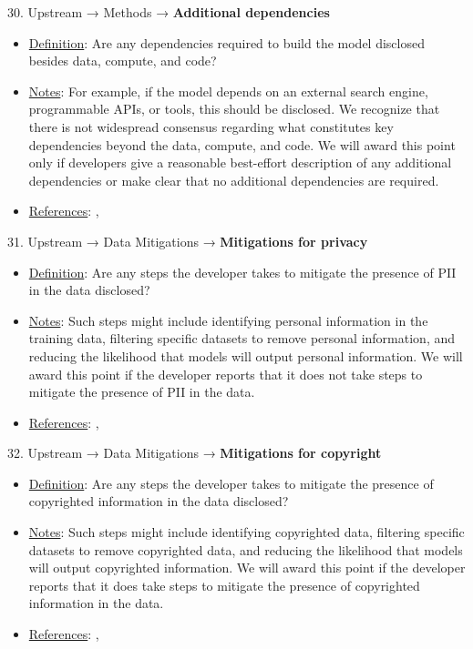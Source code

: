 30. Upstream → Methods → \textbf{Additional dependencies}
\vspace{-\parskip}
\begin{itemize}
	\item
	\underline{Definition}: Are any dependencies required to build the model disclosed besides data, compute, and code?
	\item
	\underline{Notes}: For example, if the model depends on an external search engine, programmable APIs, or tools, this should be disclosed. We recognize that there is not widespread consensus regarding what constitutes key dependencies beyond the data, compute, and code. We will award this point only if developers give a reasonable best-effort description of any additional dependencies or make clear that no additional dependencies are required.
	\item
	\underline{References}: \citet{lukas2023analyzing}, \citet{kim2023propile}
\end{itemize} \vspace{\baselineskip}


31. Upstream → Data Mitigations → \textbf{Mitigations for privacy}
\vspace{-\parskip}
\begin{itemize}
	\item
	\underline{Definition}: Are any steps the developer takes to mitigate the presence of PII in the data disclosed?
	\item
	\underline{Notes}: Such steps might include identifying personal information in the training data, filtering specific datasets to remove personal information, and reducing the likelihood that models will output personal information. We will award this point if the developer reports that it does not take steps to mitigate the presence of PII in the data.
	\item
	\underline{References}: \citet{kandpal2022deduplicating}, \citet{genlaw2023}
\end{itemize} \vspace{\baselineskip}


32. Upstream → Data Mitigations → \textbf{Mitigations for copyright}
\vspace{-\parskip}
\begin{itemize}
	\item
	\underline{Definition}: Are any steps the developer takes to mitigate the presence of copyrighted information in the data disclosed?
	\item
	\underline{Notes}: Such steps might include identifying copyrighted data, filtering specific datasets to remove copyrighted data, and reducing the likelihood that models will output copyrighted information. We will award this point if the developer reports that it does take steps to mitigate the presence of copyrighted information in the data.
	\item
	\underline{References}: \citet{bandy2021addressing}, \citet{genlaw2023}
\end{itemize} \vspace{\baselineskip}


